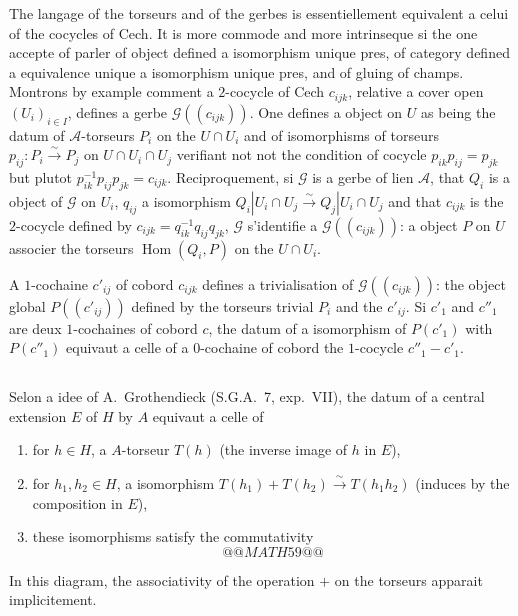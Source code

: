 \documentclass[12pt,a4paper]{article}
\theoremstyle{plain}
\theoremstyle{definition}
\theoremstyle{remark}
\DeclareMathOperator{\Hom}{Hom}
\providecommand{\Hom}{\operatorname{Hom}}
\begin{document}
The langage of the torseurs and of the gerbes is essentiellement equivalent a celui of the
cocycles of Cech. It is more commode and more intrinseque si the one accepte of parler of object
defined a isomorphism unique pres, of category defined a equivalence unique a isomorphism unique pres, and of gluing of champs. Montrons by example comment
a $2$-cocycle of Cech $c_{ijk}$, relative a cover open $(U_i)_{i \in I}$, defines a
gerbe $\mathscr{G}((c_{ijk}))$. One defines a object on $U$ as being the datum of $\mathscr{A}$-torseurs $P_i$
on the $U \cap U_i$ and of isomorphisms of torseurs $p_{ij} : P_i \xrightarrow{\sim} P_j$ on $U \cap U_i \cap U_j$ verifiant
not not the condition of cocycle $p_{ik} p_{ij} = p_{jk}$ but plutot $p_{ik}^{-1} p_{ij} p_{jk} = c_{ijk}$. Reciproquement, si $\mathscr{G}$ is a gerbe of lien $\mathscr{A}$, that $Q_i$ is a object of $\mathscr{G}$ on $U_i$, $q_{ij}$ a isomorphism $Q_i|U_i \cap U_j \xrightarrow{\sim} Q_j|U_i \cap U_j$ and that $c_{ijk}$ is the $2$-cocycle defined by
$c_{ijk} = q_{ik}^{-1} q_{ij} q_{jk}$, $\mathscr{G}$ s'identifie a $\mathscr{G}((c_{ijk}))$: a object $P$ on $U$ associer the torseurs $\Hom(Q_i, P)$
on the $U \cap U_i$.

A $1$-cochaine $c'_{ij}$ of cobord $c_{ijk}$ defines a trivialisation of $\mathscr{G}((c_{ijk}))$: the object
global $P((c'_{ij}))$ defined by the torseurs trivial $P_i$ and the $c'_{ij}$. Si $c'_1$ and $c''_1$ are deux $1$-cochaines
of cobord $c$, the datum of a isomorphism of $P(c'_1)$ with $P(c''_1)$ equivaut a celle of a
$0$-cochaine of cobord the $1$-cocycle $c''_1 - c'_1$.

\subsection{}

Selon a idee of A.~Grothendieck (S.G.A.~7, exp.~VII), the datum of a
central extension $E$ of $H$ by $A$ equivaut a celle of
\begin{enumerate}[label=(E\arabic*)]
\item for $h \in H$, a $A$-torseur $T(h)$ (the inverse image of $h$ in $E$),
\item for $h_1, h_2 \in H$, a isomorphism $T(h_1) + T(h_2) \xrightarrow{\sim} T(h_1 h_2)$ (induces by the
composition in $E$),
\item these isomorphisms satisfy the commutativity
\[
@@MATH59@@
\]
\end{enumerate}
In this diagram, the associativity of the operation $+$ on the torseurs apparait
implicitement.
\end{document}
